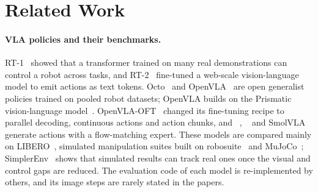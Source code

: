 \section{Related Work}
\label{sec:related}

\paragraph{VLA policies and their benchmarks.} RT-1~\citep{rt1} showed that a transformer trained on many real demonstrations can control a robot across tasks, and RT-2~\citep{rt2} fine-tuned a web-scale vision-language model to emit actions as text tokens. Octo~\citep{octo} and OpenVLA~\citep{openvla} are open generalist policies trained on pooled robot datasets; OpenVLA builds on the Prismatic vision-language model~\citep{prismatic,dinov2,siglip,llama2}. OpenVLA-OFT~\citep{oft} changed its fine-tuning recipe to parallel decoding, continuous actions and action chunks, and \pizero{}~\citep{pi0}, \pifive{}~\citep{pi05} and SmolVLA~\citep{smolvla} generate actions with a flow-matching expert. These models are compared mainly on LIBERO~\citep{libero}, simulated manipulation suites built on robosuite~\citep{robosuite} and MuJoCo~\citep{mujoco}; SimplerEnv~\citep{simplerenv} shows that simulated results can track real ones once the visual and control gaps are reduced. The evaluation code of each model is re-implemented by others, and its image steps are rarely stated in the papers.

